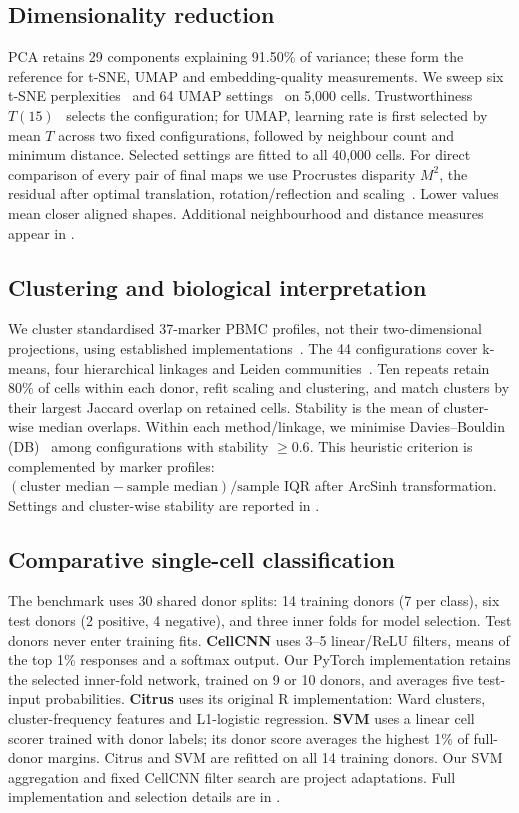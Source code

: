 \documentclass[11pt,a4paper]{article}
\begin{document}
\subsection{Dimensionality reduction}
PCA retains 29 components explaining 91.50\% of variance; these form the reference for t-SNE, UMAP and embedding-quality measurements. We sweep six t-SNE perplexities~\cite{tsne} and 64 UMAP settings~\cite{umap} on 5,000 cells. Trustworthiness $T(15)$~\cite{trust} selects the configuration; for UMAP, learning rate is first selected by mean $T$ across two fixed configurations, followed by neighbour count and minimum distance. Selected settings are fitted to all 40,000 cells. For direct comparison of every pair of final maps we use Procrustes disparity $M^2$, the residual after optimal translation, rotation/reflection and scaling~\cite{scipy}. Lower values mean closer aligned shapes. Additional neighbourhood and distance measures appear in .

\subsection{Clustering and biological interpretation}
We cluster standardised 37-marker PBMC profiles, not their two-dimensional projections, using established implementations~\cite{scipy,sklearn}. The 44 configurations cover k-means, four hierarchical linkages and Leiden communities~\cite{leiden}. Ten repeats retain 80\% of cells within each donor, refit scaling and clustering, and match clusters by their largest Jaccard overlap on retained cells. Stability is the mean of cluster-wise median overlaps. Within each method/linkage, we minimise Davies--Bouldin (DB)~\cite{db} among configurations with stability $\geq0.6$. This heuristic criterion is complemented by marker profiles: $(\text{cluster median}-\text{sample median})/\text{sample IQR}$ after ArcSinh transformation. Settings and cluster-wise stability are reported in .

\subsection{Comparative single-cell classification}
The benchmark uses 30 shared donor splits: 14 training donors (7 per class), six test donors (2 positive, 4 negative), and three inner folds for model selection. Test donors never enter training fits. \textbf{CellCNN} uses 3--5 linear/ReLU filters, means of the top 1\% responses and a softmax output. Our PyTorch implementation retains the selected inner-fold network, trained on 9 or 10 donors, and averages five test-input probabilities. \textbf{Citrus} uses its original R implementation: Ward clusters, cluster-frequency features and L1-logistic regression. \textbf{SVM} uses a linear cell scorer trained with donor labels; its donor score averages the highest 1\% of full-donor margins. Citrus and SVM are refitted on all 14 training donors. Our SVM aggregation and fixed CellCNN filter search are project adaptations. Full implementation and selection details are in .
\end{document}
